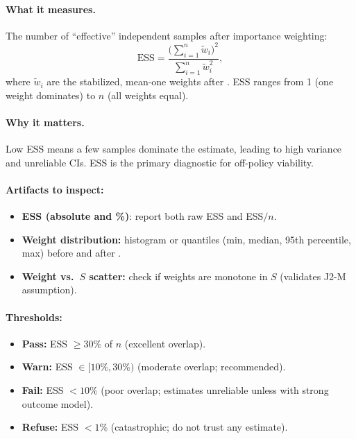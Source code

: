 \paragraph{What it measures.} The number of ``effective'' independent samples after importance weighting:
\begin{equation}
\text{ESS} = \frac{\big(\sum_{i=1}^n \tilde{w}_i\big)^2}{\sum_{i=1}^n \tilde{w}_i^2},
\end{equation}
where $\tilde{w}_i$ are the stabilized, mean-one weights after \simcal. ESS ranges from 1 (one weight dominates) to $n$ (all weights equal).

\paragraph{Why it matters.} Low ESS means a few samples dominate the estimate, leading to high variance and unreliable CIs. ESS is the primary diagnostic for off-policy viability.

\paragraph{Artifacts to inspect:}
\begin{itemize}
\item \textbf{ESS (absolute and \%)}: report both raw ESS and ESS$/n$.
\item \textbf{Weight distribution:} histogram or quantiles (min, median, 95th percentile, max) before and after \simcal.
\item \textbf{Weight vs.\ $S$ scatter:} check if weights are monotone in $S$ (validates J2-M assumption).
\end{itemize}

\paragraph{Thresholds:}
\begin{itemize}
\item \textbf{Pass:} ESS $\ge 30\%$ of $n$ (excellent overlap).
\item \textbf{Warn:} ESS $\in [10\%, 30\%)$ (moderate overlap; \dr{} recommended).
\item \textbf{Fail:} ESS $< 10\%$ (poor overlap; estimates unreliable unless \dr{} with strong outcome model).
\item \textbf{Refuse:} ESS $< 1\%$ (catastrophic; do not trust any estimate).
\end{itemize}

